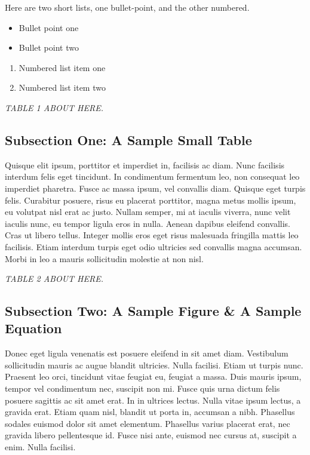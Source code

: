 Here are two short lists, one bullet-point, and the other numbered.

\begin{itemize}
\item Bullet point one
\item Bullet point two
\end{itemize}

\begin{enumerate}
\item Numbered list item one
\item Numbered list item two
\end{enumerate}

\vspace{.25in}
\begin{center}
{\LARGE \textit{TABLE 1 ABOUT HERE.}}
\end{center}

\subsection*{Subsection One: A Sample Small Table}

Quisque elit ipsum, porttitor et imperdiet in, facilisis ac diam. Nunc facilisis interdum felis eget tincidunt. \cite{glaser2009} In condimentum fermentum leo, non consequat leo imperdiet pharetra. Fusce ac massa ipsum, vel convallis diam. Quisque eget turpis felis. Curabitur posuere, risus eu placerat porttitor, magna metus mollis ipsum, eu volutpat nisl erat ac justo. Nullam semper, mi at iaculis viverra, nunc velit iaculis nunc, eu tempor ligula eros in nulla. Aenean dapibus eleifend convallis. \cite{goffman1959} Cras ut libero tellus. Integer mollis eros eget risus malesuada fringilla mattis leo facilisis. Etiam interdum turpis eget odio ultricies sed convallis magna accumsan. Morbi in leo a mauris sollicitudin molestie at non nisl. \cite{granovetter1992}

\vspace{.25in}
\begin{center}
{\LARGE \textit{TABLE 2 ABOUT HERE.}}
\end{center}

\subsection*{Subsection Two: A Sample Figure \& A Sample Equation}

Donec eget ligula venenatis est posuere eleifend in sit amet diam. Vestibulum sollicitudin mauris ac augue blandit ultricies. Nulla facilisi. Etiam ut turpis nunc. \cite{granovetter1973} Praesent leo orci, tincidunt vitae feugiat eu, feugiat a massa. Duis mauris ipsum, tempor vel condimentum nec, suscipit non mi. Fusce quis urna dictum felis posuere sagittis ac sit amet erat. In in ultrices lectus. Nulla vitae ipsum lectus, a gravida erat. Etiam quam nisl, blandit ut porta in, accumsan a nibh. \cite{hochschild1983} Phasellus sodales euismod dolor sit amet elementum. Phasellus varius placerat erat, nec gravida libero pellentesque id. Fusce nisi ante, euismod nec cursus at, suscipit a enim. Nulla facilisi.

